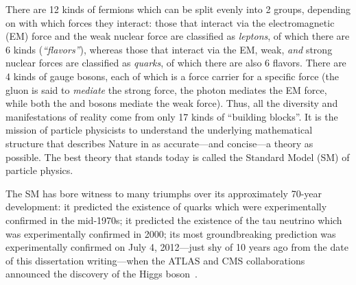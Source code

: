 There are 12 kinds of fermions which can be split evenly into 2 groups, depending on with which forces they interact:
those that interact via the electromagnetic (EM) force and the weak nuclear force are classified as \emph{leptons}, of which there are 6 kinds (\emph{``flavors''}),
whereas those that interact via the EM, weak, \emph{and} strong nuclear forces are classified as \emph{quarks}, of which there are also 6 flavors.
There are 4 kinds of gauge bosons, each of which is a force carrier for a specific force
(the gluon is said to \emph{mediate} the strong force, the photon mediates the EM force, while both the \PWpm and \PZ bosons mediate the weak force).
Thus, all the diversity and manifestations of reality come from only 17 kinds of ``building blocks''.
It is the mission of particle physicists to understand the underlying mathematical structure that describes Nature in as accurate---and concise---a theory as possible.
The best theory that stands today is called the Standard Model (SM) of particle physics.

The SM has bore witness to many triumphs over its approximately 70-year development:
it predicted the existence of quarks which were experimentally confirmed in the mid-1970s;
it predicted the existence of the tau neutrino which was experimentally confirmed in 2000;
its most groundbreaking prediction was experimentally confirmed on July 4, 2012---just shy of 10 years ago from the date of this dissertation writing---when the ATLAS and CMS collaborations announced the discovery of the Higgs boson~\cite{chatrchyan_observation_2012, chatrchyan_observation_2013, aad_observation_2012}.

